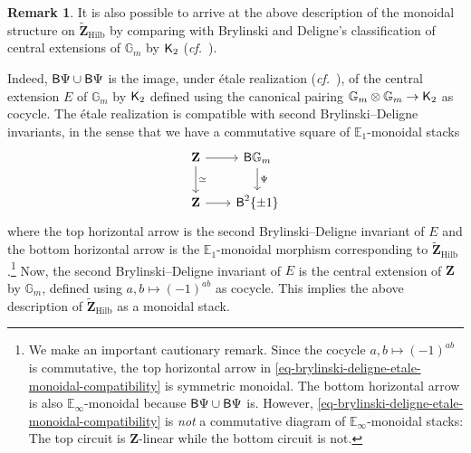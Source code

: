 \documentclass[10pt,english,reqno]{amsart}
\newcommand{\integers}{\mathbf Z}
\newcommand{\deloop}{\textnormal{\textsf{B}}}
\newcommand{\Hilbert}{\mathrm{Hilb}}
\newcommand{\Ktheory}{\textnormal{\textsf{K}}}
\theoremstyle{definition}
\newtheorem{rem}[subsubsection]{Remark}
\numberwithin{equation}{section}
\begin{document}
\begin{rem}
It is also possible to arrive at the above description of the monoidal structure on $\widetilde{\integers}_{\Hilbert}$ by comparing with Brylinski and Deligne's classification of central extensions of $\mathbb G_m$ by $\Ktheory_2$ (\emph{cf.}~\cite[\S3]{MR1896177}).

Indeed, $\deloop\Psi\cup\deloop \Psi$ is the image, under \'etale realization (\emph{cf.}~\cite[\S2.3.2]{zhao2022metaplectic}), of the central extension $E$ of $\mathbb G_m$ by $\Ktheory_2$ defined using the canonical pairing $\mathbb G_m\otimes \mathbb G_m \rightarrow \Ktheory_2$ as cocycle. The \'etale realization is compatible with second Brylinski--Deligne invariants, in the sense that we have a commutative square of $\mathbb E_1$-monoidal stacks
\begin{equation}
\label{eq-brylinski-deligne-etale-monoidal-compatibility}
\begin{tikzcd}[column sep = 2em]
	\integers \ar[r]\ar[d, "\simeq"] & \deloop\mathbb G_m \ar[d, "\Psi"] \\
	\integers \ar[r] & \deloop^2\{\pm 1\}
\end{tikzcd}
\end{equation}
where the top horizontal arrow is the second Brylinski--Deligne invariant of $E$ and the bottom horizontal arrow is the $\mathbb E_1$-monoidal morphism corresponding to $\widetilde{\integers}_{\Hilbert}$.\footnote{We make an important cautionary remark. Since the cocycle $a, b\mapsto (-1)^{ab}$ is commutative, the top horizontal arrow in \eqref{eq-brylinski-deligne-etale-monoidal-compatibility} is symmetric monoidal. The bottom horizontal arrow is also $\mathbb E_{\infty}$-monoidal because $\deloop\Psi\cup\deloop\Psi$ is. However, \eqref{eq-brylinski-deligne-etale-monoidal-compatibility} is \emph{not} a commutative diagram of $\mathbb E_{\infty}$-monoidal stacks: The top circuit is $\integers$-linear while the bottom circuit is not.} Now, the second Brylinski--Deligne invariant of $E$ is the central extension of $\integers$ by $\mathbb G_m$, defined using $a,b\mapsto(-1)^{ab}$ as cocycle. This implies the above description of $\widetilde{\integers}_{\Hilbert}$ as a monoidal stack.
\end{rem}

\end{document}
